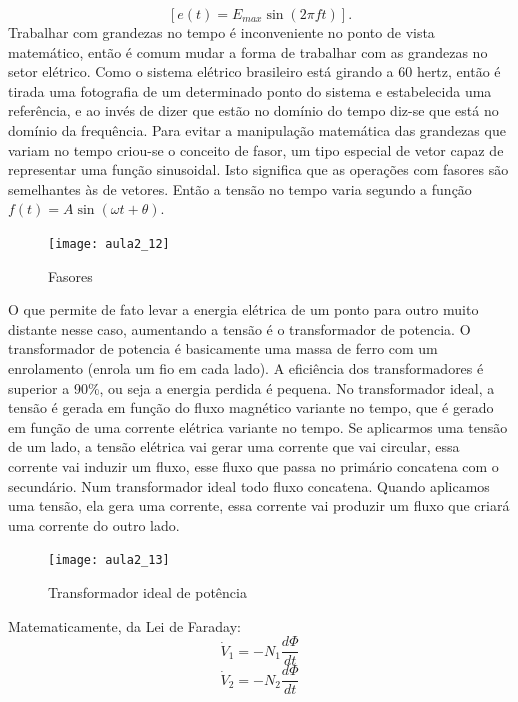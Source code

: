\begin{equation}\label{eq:omega11}
[e(t)=E_{max}\sin(2\pi ft)].
\end{equation}
Trabalhar com grandezas no tempo é inconveniente no ponto de vista
matemático, então é comum mudar a forma de trabalhar com as grandezas
no setor elétrico. Como o sistema elétrico brasileiro está girando a 60 hertz,
então é tirada uma fotografia de um determinado ponto do sistema e
estabelecida
uma referência, e ao invés de dizer que estão no domínio do tempo diz-se
que está no domínio da frequência. Para evitar a manipulação matemática das grandezas que variam no tempo
criou-se o conceito de fasor, um tipo especial de vetor capaz de representar
uma função sinusoidal. Isto significa que as operações com fasores
são semelhantes às de vetores.
Então a tensão no tempo varia segundo a função $f(t)=A\sin(\omega t+\theta)$.
\begin{figure}[H]
\begin{centering}
\texttt{[image: aula2\_12]}\protect\caption{\label{fig:aula2_12}Fasores }
\end{centering}
\end{figure}
O que permite de fato levar a energia elétrica de um ponto para outro
muito distante nesse caso, aumentando a tensão é o transformador
de potencia.
O transformador de potencia é basicamente uma massa de ferro com um
enrolamento (enrola um fio em cada lado). A eficiência dos transformadores é
superior a 90\%, ou seja a energia perdida é pequena.
No transformador ideal, a tensão é gerada em função do fluxo magnético
variante no tempo, que é gerado em
função de uma corrente elétrica variante no tempo.
Se aplicarmos uma tensão de um lado, a tensão elétrica vai gerar uma
corrente que vai circular, essa corrente vai induzir um fluxo, esse
fluxo que passa no primário concatena com o secundário. Num transformador
ideal todo fluxo concatena. Quando aplicamos uma tensão, ela gera uma corrente, essa corrente vai produzir um fluxo que criará uma corrente do outro lado.
\begin{figure}[H]
\begin{centering}
\texttt{[image: aula2\_13]}\protect\caption{\label{fig:aula2_13}Transformador ideal de potência}
\end{centering}
\end{figure}

Matematicamente, da Lei de Faraday:
\begin{equation}\label{eq:lf}
{\dot{V}_{1}=-N_{1}\frac{d\Phi}{dt}}
\end{equation}
\begin{equation}\label{eq:lf2}
{\dot{V}_{2}=-N_{2}\frac{d\Phi}{dt}}
\end{equation}


